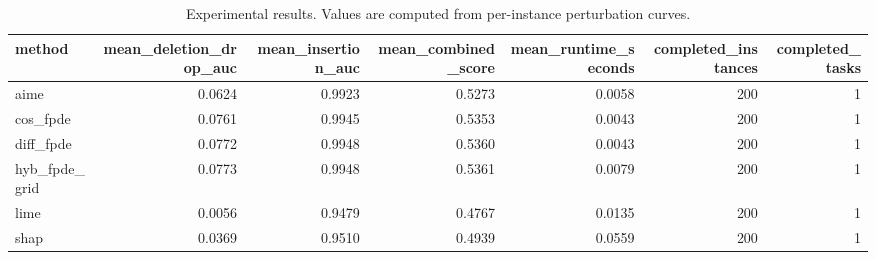\begin{table}[t]
\caption{Experimental results. Values are computed from per-instance perturbation curves.}
\label{tab:main_results_computed}
\centering
\begin{tabular}{lrrrrrr}
\toprule
method & mean\_deletion\_drop\_auc & mean\_insertion\_auc & mean\_combined\_score & mean\_runtime\_seconds & completed\_instances & completed\_tasks \\
\midrule
aime & 0.0624 & 0.9923 & 0.5273 & 0.0058 & 200 & 1 \\
cos\_fpde & 0.0761 & 0.9945 & 0.5353 & 0.0043 & 200 & 1 \\
diff\_fpde & 0.0772 & 0.9948 & 0.5360 & 0.0043 & 200 & 1 \\
hyb\_fpde\_grid & 0.0773 & 0.9948 & 0.5361 & 0.0079 & 200 & 1 \\
lime & 0.0056 & 0.9479 & 0.4767 & 0.0135 & 200 & 1 \\
shap & 0.0369 & 0.9510 & 0.4939 & 0.0559 & 200 & 1 \\
\bottomrule
\end{tabular}

\end{table}
